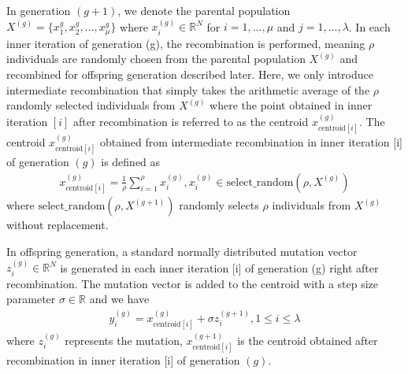 In generation $(g+1)$, we denote the parental population $X^{(g)} = \{x_1^{g},x_2^{g},...,x_\mu^{g} \}$ where $x_i^{(g)} \in \mathbb{R}^N$ for $i=1,...,\mu$ and $j=1,...,\lambda$. In each inner iteration of generation (g), the recombination is performed, meaning $\rho$ individuals are randomly chosen from the parental population $X^{(g)}$ and recombined for offspring generation described later. Here, we only introduce intermediate recombination that simply takes the arithmetic average of the $\rho$ randomly selected individuals from $X^{(g)}$ where the point obtained in inner iteration $[i]$ after recombination is referred to as the centroid $x_{\text{centroid}[i]}^{(g)}$. The centroid $x_{\text{centroid}[i]}^{(g)}$ obtained from intermediate recombination in inner iteration [i] of generation $(g)$ is defined as
\begin{align}
x_{\text{centroid}[i]}^{(g)} = 
\frac{1}{\rho} \sum_{i=1}^\rho x_i^{(g)},x_i^{(g)} \in \text{select\_random} (\rho , X^{(g)}) 
\end{align}
where $\text{select\_random}(\rho,X^{(g+1)})$ randomly selects $\rho$ individuals from $X^{(g)}$ without replacement. 

In offspring generation, a standard normally distributed mutation vector $z_i^{(g)} \in \mathbb{R}^N$ is generated in each inner iteration [i] of generation (g) right after recombination. The mutation vector is added to the centroid with a step size parameter $\sigma \in \mathbb{R}$ and we have 
\begin{align}
y_i^{(g)} = x_{\text{centroid}[i]}^{(g)} + \sigma z_i^{(g+1)}, 1\leq i \leq \lambda
\end{align}
where $z_i^{(g)}$ represents the mutation, $x_{\text{centroid}[i]}^{(g+1)}$ is the centroid obtained after recombination in inner iteration [i] of generation $(g)$. 

